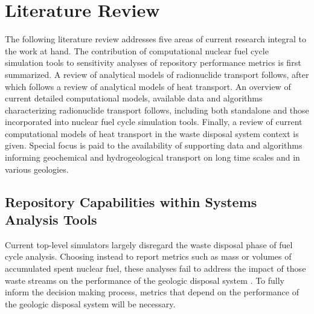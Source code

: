 \chapter{Literature Review}
\label{ch:litrev}

The following literature review addresses five areas of current research
integral to the work at hand. The contribution of computational nuclear fuel
cycle simulation tools to sensitivity analyses of repository performance
metrics is first summarized. A review of analytical models of radionuclide transport
follows, after which follows a review of analytical models of heat transport.
An overview of current detailed computational models, available data and
algorithms characterizing radionuclide transport follows, including both standalone
and those incorporated into nuclear fuel cycle simulation tools. Finally, a
review of current computational models of heat transport in the waste disposal
system context is given.  Special focus is paid to the availability of
supporting data and algorithms informing geochemical and hydrogeological
transport on long time scales and in various geologies. 

\section{Repository Capabilities within Systems Analysis Tools}
\label{sec:SA_repos}



Current top-level simulators largely disregard the waste disposal phase of fuel
cycle analysis. Choosing instead to report metrics such as mass or volumes of
accumulated spent nuclear fuel, these analyses fail to address the impact of
those waste streams on the performance of the geologic disposal system
\cite{wilson_comparing_2011}.  To fully inform the decision making process, 
metrics that depend on the performance of the geologic disposal system will be
necessary. 

